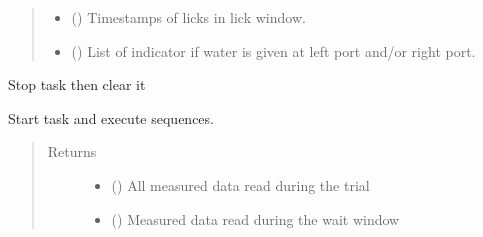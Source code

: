 \documentclass[letterpaper,10pt,english]{sphinxmanual}
\begin{document}
\begin{fulllineitems}
\begin{fulllineitems}
\begin{quote}
\begin{description}
\begin{itemize}
\item {} 
\sphinxAtStartPar
{} () \textendash{} Timestamps of licks in lick window.

\item {} 
\sphinxAtStartPar
{} () \textendash{} List of indicator if water is given at left port and/or right port.

\end{itemize}


\end{description}\end{quote}

\end{fulllineitems}


\begin{fulllineitems}
\label{\detokenize{NoSeMazeController/daqface:daqface.DAQ.DoAiMultiTaskOdourTraining.ClearTasks}}
\pysigstartsignatures
{}
\pysigstopsignatures
\sphinxAtStartPar
Stop task then clear it

\end{fulllineitems}


\begin{fulllineitems}
\label{\detokenize{NoSeMazeController/daqface:daqface.DAQ.DoAiMultiTaskOdourTraining.DoTask}}
\pysigstartsignatures
{}
\pysigstopsignatures
\sphinxAtStartPar
Start task and execute sequences.
\begin{quote}\begin{description}
\item[{Returns}] \leavevmode
\sphinxAtStartPar
\begin{itemize}
\item {} 
\sphinxAtStartPar
{} () \textendash{} All measured data read during the trial

\item {} 
\sphinxAtStartPar
{} () \textendash{} Measured data read during the wait window


\end{itemize}
\end{description}
\end{quote}
\end{fulllineitems}
\end{fulllineitems}
\end{document}
